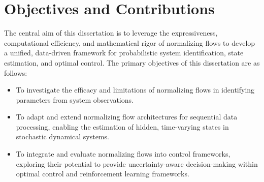 \section{Objectives and Contributions}
\label{sec:introduction:objectives}
The central aim of this dissertation is to leverage the expressiveness, computational efficiency, and mathematical rigor of normalizing flows to develop a unified, data-driven framework for probabilistic system identification, state estimation, and optimal control. The primary objectives of this dissertation are as follows:
\begin{itemize}
    \item To investigate the efficacy and limitations of normalizing flows in identifying parameters from system observations.
    \item To adapt and extend normalizing flow architectures for sequential data processing, enabling the estimation of hidden, time-varying states in stochastic dynamical systems.
    \item To integrate and evaluate normalizing flows into control frameworks, exploring their potential to provide uncertainty-aware decision-making within optimal control and reinforcement learning frameworks.
\end{itemize}

